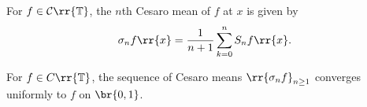 \documentclass{article}
\begin{document}
\begin{definition}
  For $f\in\mathcal C\rr{\mathbb T}$, the $n$th Cesaro mean of $f$ at $x$ is
  given by
  \begin{align*}
    \sigma_n f\rr{x} = \frac{1}{n+1} \sum_{k=0}^n S_n f\rr{x}.
  \end{align*}
\end{definition}

\begin{theorem}
  For $f\in C\rr{\mathbb T}$, the sequence of Cesaro means $\rr{\sigma_n f}_{n\geq 1}$
  converges uniformly to $f$ on $\br{0,1}$.
\end{theorem}
\end{document}

